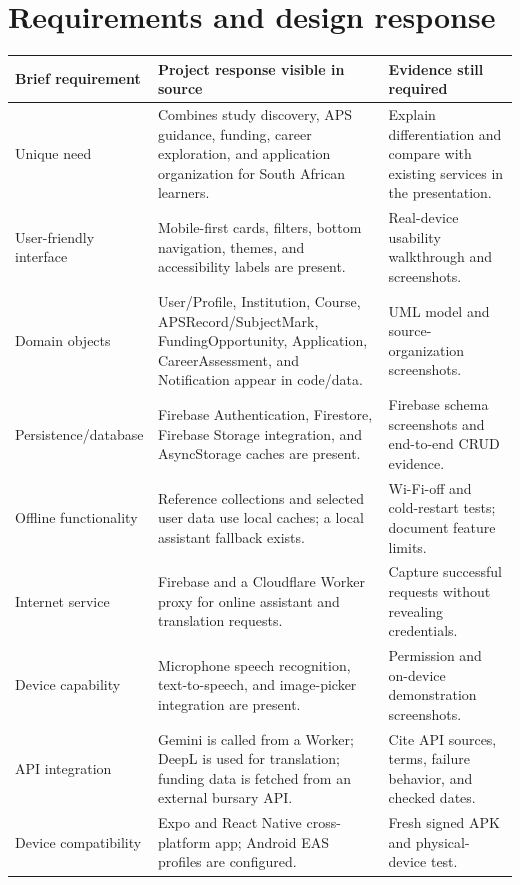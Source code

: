 \documentclass[11pt,a4paper]{article}
\begin{document}
\section{Requirements and design response}
\begin{longtable}{p{}p{}p{}}
\toprule
\textbf{Brief requirement} & \textbf{Project response visible in source} & \textbf{Evidence still required}\\
\midrule
Unique need & Combines study discovery, APS guidance, funding, career exploration, and application organization for South African learners. & Explain differentiation and compare with existing services in the presentation.\\
User-friendly interface & Mobile-first cards, filters, bottom navigation, themes, and accessibility labels are present. & Real-device usability walkthrough and screenshots.\\
Domain objects & User/Profile, Institution, Course, APSRecord/SubjectMark, FundingOpportunity, Application, CareerAssessment, and Notification appear in code/data. & UML model and source-organization screenshots.\\
Persistence/database & Firebase Authentication, Firestore, Firebase Storage integration, and AsyncStorage caches are present. & Firebase schema screenshots and end-to-end CRUD evidence.\\
Offline functionality & Reference collections and selected user data use local caches; a local assistant fallback exists. & Wi-Fi-off and cold-restart tests; document feature limits.\\
Internet service & Firebase and a Cloudflare Worker proxy for online assistant and translation requests. & Capture successful requests without revealing credentials.\\
Device capability & Microphone speech recognition, text-to-speech, and image-picker integration are present. & Permission and on-device demonstration screenshots.\\
API integration & Gemini is called from a Worker; DeepL is used for translation; funding data is fetched from an external bursary API. & Cite API sources, terms, failure behavior, and checked dates.\\
Device compatibility & Expo and React Native cross-platform app; Android EAS profiles are configured. & Fresh signed APK and physical-device test.\\
\bottomrule
\end{longtable}
\end{document}
